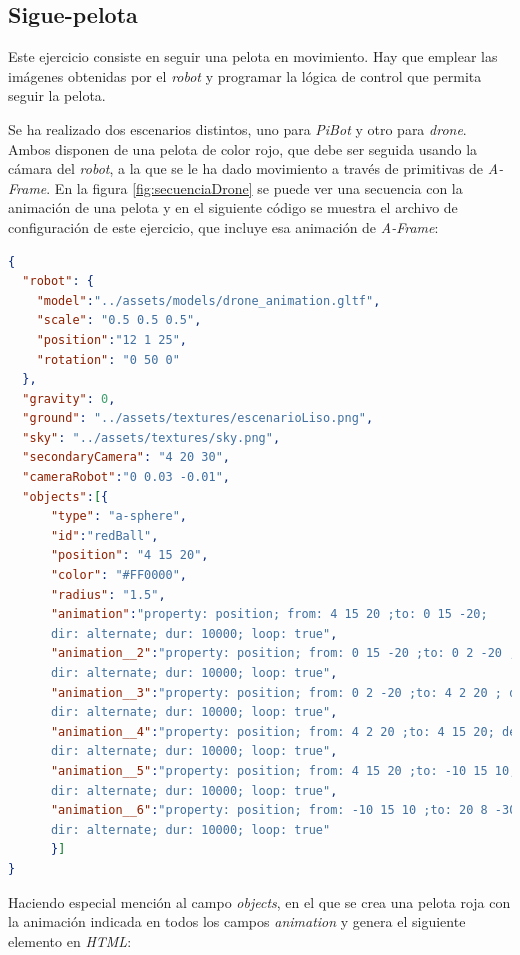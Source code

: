 \subsection{Sigue-pelota}
\label{subsec:pelota}

Este ejercicio consiste en seguir una pelota en movimiento. Hay que emplear las imágenes obtenidas por el \textit{robot} y programar la lógica de control que permita seguir la pelota.

Se ha realizado dos escenarios distintos, uno para \textit{PiBot} y otro para \textit{drone}.
Ambos disponen de una pelota de color rojo, que debe ser seguida usando la cámara del \textit{robot}, a la que se le ha dado movimiento a través de primitivas de \textit{A-Frame}. En la figura \ref{fig:secuenciaDrone} se puede ver una secuencia con la animación de una pelota y en el siguiente código se muestra el archivo de configuración de este ejercicio, que incluye esa animación de \textit{A-Frame}:

\begin{lstlisting}[language=json]
{
  "robot": {
    "model":"../assets/models/drone_animation.gltf",
    "scale": "0.5 0.5 0.5",
    "position":"12 1 25",
    "rotation": "0 50 0"
  },
  "gravity": 0,
  "ground": "../assets/textures/escenarioLiso.png",
  "sky": "../assets/textures/sky.png",
  "secondaryCamera": "4 20 30",
  "cameraRobot":"0 0.03 -0.01",
  "objects":[{
      "type": "a-sphere",
      "id":"redBall",
      "position": "4 15 20",
      "color": "#FF0000",
      "radius": "1.5",
      "animation":"property: position; from: 4 15 20 ;to: 0 15 -20; 
      dir: alternate; dur: 10000; loop: true",
      "animation__2":"property: position; from: 0 15 -20 ;to: 0 2 -20 ; delay: 10000; 
      dir: alternate; dur: 10000; loop: true",
      "animation__3":"property: position; from: 0 2 -20 ;to: 4 2 20 ; delay: 20000; 
      dir: alternate; dur: 10000; loop: true",
      "animation__4":"property: position; from: 4 2 20 ;to: 4 15 20; delay: 30000; 
      dir: alternate; dur: 10000; loop: true",
      "animation__5":"property: position; from: 4 15 20 ;to: -10 15 10; delay: 40000; 
      dir: alternate; dur: 10000; loop: true",
      "animation__6":"property: position; from: -10 15 10 ;to: 20 8 -30; delay: 50000; 
      dir: alternate; dur: 10000; loop: true"
      }]
}
\end{lstlisting}

Haciendo especial mención al campo \textit{objects}, en el que se crea una pelota roja con la animación indicada en todos los campos \textit{animation} y genera el siguiente elemento en \textit{HTML}:


